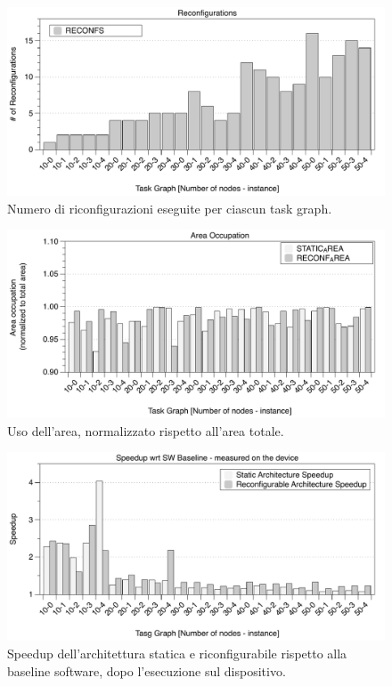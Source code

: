 \begin{figure}[t]
 \begin{center}
  \includegraphics[width=\textwidth]{./capitoli/figure/cap6/FPL_Reconfs.pdf}
  \caption{Numero di riconfigurazioni eseguite per ciascun task graph.}
  \label{fig:numeroRiconfigurazioni}
 \end{center}
\end{figure}



\begin{figure}[t]
 \begin{center}
  \includegraphics[width=\textwidth]{./capitoli/figure/cap6/FPL_Area.pdf}
  \caption{Uso dell'area, normalizzato rispetto all'area totale.}
  \label{fig:usoArea}
 \end{center}
\end{figure}



\begin{figure}[t]
 \begin{center}
  \includegraphics[width=\textwidth]{./capitoli/figure/cap6/FPL_Runtime.pdf}
  \caption{Speedup dell'architettura statica e riconfigurabile rispetto alla
  baseline software, dopo l'esecuzione sul dispositivo.}
  \label{fig:speedupBaselineRuntime}
 \end{center}
\end{figure}
